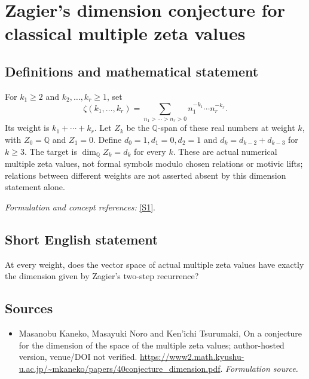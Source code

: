 \documentclass[11pt]{article}
\begin{document}
\section*{\texorpdfstring{Zagier's dimension conjecture for classical multiple zeta values}{Zagier's dimension conjecture for classical multiple zeta values}}\label{239}
\subsection{Definitions and mathematical statement}
For $k_1\ge2$ and $k_2,\ldots,k_r\ge1$, set
\[
 \zeta(k_1,\ldots,k_r)=\sum_{n_1>\cdots>n_r>0}
 n_1^{-k_1}\cdots n_r^{-k_r}.
\]
Its weight is $k_1+\cdots+k_r$. Let $Z_k$ be the ${\mathbb{Q}}$-span of these real numbers at weight $k$, with $Z_0={\mathbb{Q}}$ and $Z_1=0$. Define $d_0=1,d_1=0,d_2=1$ and
$d_k=d_{k-2}+d_{k-3}$ for $k\ge3$. The target is $\dim_{{\mathbb{Q}}}Z_k=d_k$ for every $k$. These are actual numerical multiple zeta values, not formal symbols modulo chosen relations or motivic lifts; relations between different weights are not asserted absent by this dimension statement alone.
\par\smallskip\textit{Formulation and concept references:} \href{https://www2.math.kyushu-u.ac.jp/~mkaneko/papers/40conjecture_dimension.pdf}{[S1]}.

\subsection{Short English statement}
At every weight, does the vector space of actual multiple zeta values have exactly the dimension given by Zagier's two-step recurrence?
\subsection{Sources}
\begin{itemize}
\item[S1]Masanobu Kaneko, Masayuki Noro and Ken'ichi Tsurumaki, On a conjecture for the dimension of the space of the multiple zeta values; author-hosted version, venue/DOI not verified.
\url{https://www2.math.kyushu-u.ac.jp/~mkaneko/papers/40conjecture_dimension.pdf}.
\textit{Formulation source.}
\end{itemize}
\end{document}
